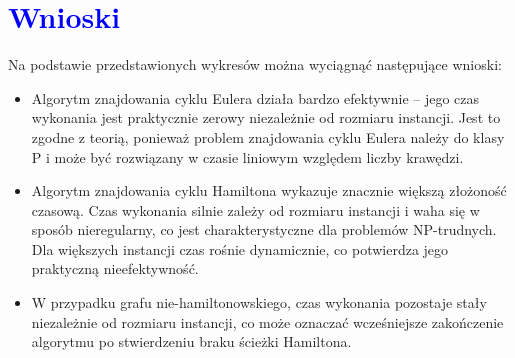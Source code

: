 \documentclass{article}
\begin{document}
	\section*{\textcolor{blue}{Wnioski}}
	Na podstawie przedstawionych wykresów można wyciągnąć następujące wnioski:
	
	\begin{itemize}
		\item Algorytm znajdowania cyklu Eulera działa bardzo efektywnie – jego czas wykonania jest praktycznie zerowy niezależnie od rozmiaru instancji. Jest to zgodne z teorią, ponieważ problem znajdowania cyklu Eulera należy do klasy P i może być rozwiązany w czasie liniowym względem liczby krawędzi.
		
		\item Algorytm znajdowania cyklu Hamiltona wykazuje znacznie większą złożoność czasową. Czas wykonania silnie zależy od rozmiaru instancji i waha się w sposób nieregularny, co jest charakterystyczne dla problemów NP-trudnych. Dla większych instancji czas rośnie dynamicznie, co potwierdza jego praktyczną nieefektywność.
		
		\item W przypadku grafu nie-hamiltonowskiego, czas wykonania pozostaje stały niezależnie od rozmiaru instancji, co może oznaczać wcześniejsze zakończenie algorytmu po stwierdzeniu braku ścieżki Hamiltona.
	\end{itemize}
	
\end{document}
